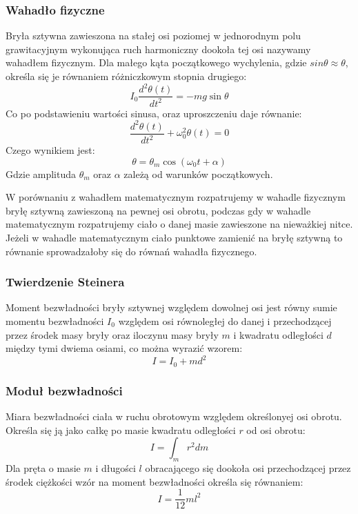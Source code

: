 \documentclass[a4paper,12pts]{article}
\begin{document}
	\subsubsection{Wahadło fizyczne}
	Bryła sztywna zawieszona na stałej osi poziomej w jednorodnym polu grawitacyjnym wykonująca ruch harmoniczny dookoła tej osi nazywamy wahadłem fizycznym. Dla małego kąta początkowego wychylenia, gdzie $sin \theta \approx \theta$, określa się je równaniem różniczkowym stopnia drugiego:
	\begin{equation}
		I_0 \frac{d^2 \theta(t)}{dt^2} = -mg \sin \theta
	\end{equation}
	Co po podstawieniu wartości sinusa, oraz uproszczeniu daje równanie:
	\begin{equation}
		\frac{d^2 \theta(t)}{dt^2} + \omega_0^2 \theta (t) = 0
	\end{equation}
	Czego wynikiem jest:
	\begin{equation}
		\theta = \theta_m \cos(\omega_0 t + \alpha)
	\end{equation}
	Gdzie amplituda $\theta_m$ oraz $\alpha$ zależą od warunków początkowych.
	
	W porównaniu z wahadłem matematycznym rozpatrujemy w wahadle fizycznym bryłę sztywną zawieszoną na pewnej osi obrotu, podczas gdy w wahadle matematycznym rozpatrujemy ciało o danej masie zawieszone na nieważkiej nitce. Jeżeli w wahadle matematycznym ciało punktowe zamienić na bryłę sztywną to równanie sprowadzałoby się do równań wahadła fizycznego.
	
	
	\subsubsection{Twierdzenie Steinera}
	Moment bezwładności bryły sztywnej względem dowolnej osi jest równy sumie momentu bezwładności $I_0$ względem osi równoległej do danej i przechodzącej przez środek masy bryły oraz iloczynu masy bryły $m$ i kwadratu odległości $d$ między tymi dwiema osiami, co można wyrazić wzorem:
	\begin{equation}
		I = I_0 + md^2
		\label{steiner}
	\end{equation}

	
	
	\subsubsection{Moduł bezwładności}
	Miara bezwładności ciała w ruchu obrotowym względem określonyej osi obrotu. Określa się ją jako całkę po masie kwadratu odległości $r$ od osi obrotu:
	\begin{equation}
		I = \int_{m} r^2 dm
	\end{equation}
	Dla pręta o masie $m$ i długości $l$ obracającego się dookoła osi przechodzącej przez środek ciężkości wzór na moment bezwładności określa się równaniem:
	\begin{equation}
		I = \frac{1}{12}ml^2
		\label{pret}
	\end{equation}
\end{document}
